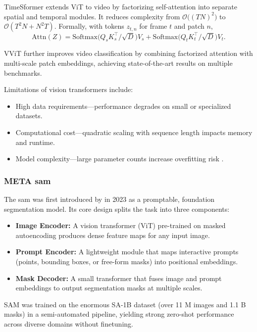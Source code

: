 TimeSformer \cite{bertasius_timesformer_2021} extends ViT to video by factorizing self-attention into separate spatial and temporal modules. It reduces complexity from $\mathcal{O}\bigl((TN)^2\bigr)$ to $\mathcal{O}(T^2N + N^2T)$. Formally, with tokens $z_{t,n}$ for frame $t$ and patch $n$,
\[
\mathrm{Attn}(Z)
= \mathrm{Softmax}\!\bigl(Q_sK_s^\top/\sqrt{D}\bigr)V_s
+ \mathrm{Softmax}\!\bigl(Q_tK_t^\top/\sqrt{D}\bigr)V_t.
\]

VViT \cite{arnab_vvit_2021} further improves video classification by combining factorized attention with multi-scale patch embeddings, achieving state-of-the-art results on multiple benchmarks.


Limitations of vision transformers include:
\begin{itemize}

    \item High data requirements—performance degrades on small or specialized datasets.  
    \item Computational cost—quadratic scaling with sequence length impacts memory and runtime.  
    \item Model complexity—large parameter counts increase overfitting risk \cite{lee_enhancing_mamba_s6_2024}.
\end{itemize}


\subsubsection{META \acrlong{sam}}
\label{ssec:meta_sam2}
The \acrfull{sam} was first introduced by \textcite{kirillov_segment_2023} in 2023 as a promptable, foundation segmentation model. Its core design splits the task into three components:
\begin{itemize}
    \item \textbf{Image Encoder:} A vision transformer (ViT) pre-trained on masked autoencoding produces dense feature maps for any input image.
    \item \textbf{Prompt Encoder:} A lightweight module that maps interactive prompts (points, bounding boxes, or free-form masks) into positional embeddings.
    \item \textbf{Mask Decoder:} A small transformer that fuses image and prompt embeddings to output segmentation masks at multiple scales.
\end{itemize}
SAM was trained on the enormous SA-1B dataset (over 11 M images and 1.1 B masks) in a semi-automated pipeline, yielding strong zero-shot performance across diverse domains without finetuning.

